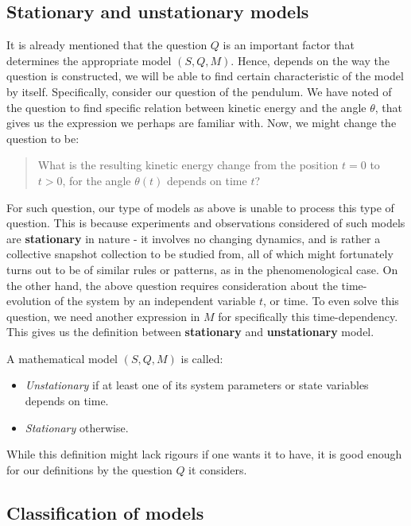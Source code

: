\subsection{Stationary and unstationary models}

It is already mentioned that the question $Q$ is an important factor that determines the appropriate model $(S,Q,M)$. Hence, depends on the way the question is constructed, we will be able to find certain characteristic of the model by itself. Specifically, consider our question of the pendulum. We have noted of the question to find specific relation between kinetic energy and the angle $\theta$, that gives us the expression we perhaps are familiar with. Now, we might change the question to be: 

\blockquote{What is the resulting kinetic energy change from the position $t=0$ to $t>0$, for the angle $\theta(t)$ depends on time $t$?}

For such question, our type of models as above is unable to process this type of question. This is because experiments and observations considered of such models are \textbf{stationary} in nature - it involves no changing dynamics, and is rather a collective snapshot collection to be studied from, all of which might fortunately turns out to be of similar rules or patterns, as in the phenomenological case. On the other hand, the above question requires consideration about the time-evolution of the system by an independent variable $t$, or time. To even solve this question, we need another expression in $M$ for specifically this time-dependency. This gives us the definition between \textbf{stationary} and \textbf{unstationary} model. 

\begin{definition}
    A mathematical model $(S,Q,M)$ is called: 
    \begin{itemize}[topsep=1pt, itemsep=1pt]
        \item \textit{Unstationary} if at least one of its system parameters or state variables depends on time. 
        \item \textit{Stationary} otherwise. 
    \end{itemize}
\end{definition}
While this definition might lack rigours if one wants it to have, it is good enough for our definitions by the question $Q$ it considers. 

\subsection{Classification of models}

